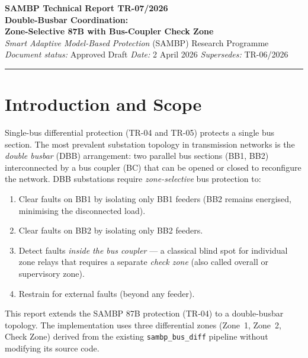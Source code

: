 \documentclass[12pt,a4paper]{article}
\begin{document}

\begin{center}
  {\Large\bfseries SAMBP Technical Report TR-07/2026}\\[6pt]
  {\large\bfseries Double-Busbar Coordination:\\
   Zone-Selective 87B with Bus-Coupler Check Zone}\\[10pt]
  {\normalsize
    \textit{Smart Adaptive Model-Based Protection} (SAMBP) Research Programme}\\[4pt]
  {\small\textit{Document status:} Approved Draft \quad
         \textit{Date:} 2 April 2026 \quad
         \textit{Supersedes:} TR-06/2026}\\[2pt]
  \rule{\linewidth}{0.6pt}
\end{center}

\tableofcontents
\listoftables
\listoffigures
\newpage

\section{Introduction and Scope}

Single-bus differential protection (TR-04 and TR-05) protects a single
bus section.  The most prevalent substation topology in transmission
networks is the \emph{double busbar} (DBB) arrangement: two parallel bus
sections (BB1, BB2) interconnected by a bus coupler (BC) that can be
opened or closed to reconfigure the network.  DBB substations require
\emph{zone-selective} bus protection to:

\begin{enumerate}
  \item Clear faults on BB1 by isolating only BB1 feeders (BB2 remains
    energised, minimising the disconnected load).
  \item Clear faults on BB2 by isolating only BB2 feeders.
  \item Detect faults \emph{inside the bus coupler} --- a classical
    blind spot for individual zone relays that requires a separate
    \emph{check zone} (also called overall or supervisory zone).
  \item Restrain for external faults (beyond any feeder).
\end{enumerate}

This report extends the SAMBP 87B protection (TR-04) to a double-busbar
topology.  The implementation uses three differential zones
(Zone~1, Zone~2, Check Zone) derived from the existing
\texttt{sambp\_bus\_diff} pipeline without modifying its source code.
\end{document}

